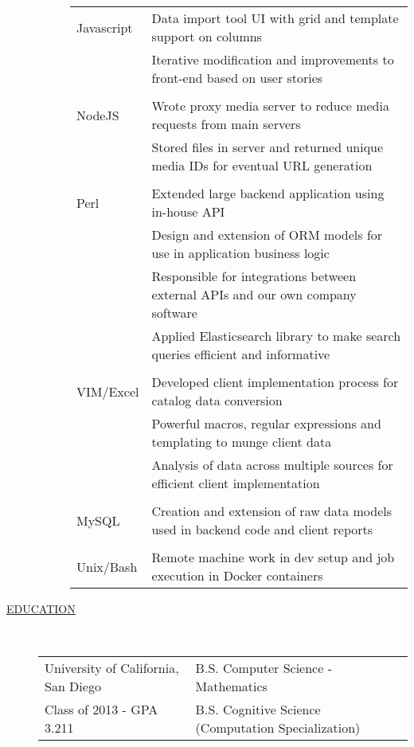 \documentclass[12pt]{article}
\begin{document}
\begin{description}
\begin{description}
                \begin{tabular}{l|l}
                    Javascript & Data import tool UI with grid and template support on columns\\
                               & Iterative modification and improvements to front-end based on user stories\\
                                 \\
                    NodeJS     & Wrote proxy media server to reduce media requests from main servers \\
                               & Stored files in server and returned unique media IDs for eventual URL generation\\
                                 \\
                    Perl   & Extended large backend application using in-house API \\
                               & Design and extension of ORM models for use in application business logic \\
                               & Responsible for integrations between external APIs and our own company software \\
                               & Applied Elasticsearch library to make search queries efficient and informative\\
                                 \\
                    VIM/Excel  & Developed client implementation process for catalog data conversion\\
                               & Powerful macros, regular expressions and templating to munge client data\\
                               & Analysis of data across multiple sources for efficient client implementation\\
                                 \\
                    MySQL      & Creation and extension of raw data models used in backend code and client reports\\
                                 \\
                    Unix/Bash  & Remote machine work in dev setup and job execution in Docker containers\\
                \end{tabular}

        \end{description}

    \item[\underline{EDUCATION}]  \hfill \\
        \begin{tabular}{l|l}
            University of California, San Diego & B.S. Computer Science - Mathematics \\
            \hfill Class of 2013 - GPA 3.211    & B.S. Cognitive Science (Computation Specialization)\\
        \end{tabular}


\end{description}
\end{document}
